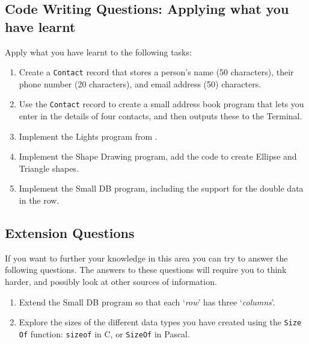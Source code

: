 
\clearpage
\subsection{Code Writing Questions: Applying what you have learnt} %
\label{sub:code_writing_questions_applying_what_you_have_learnt_types}

Apply what you have learnt to the following tasks:

\begin{enumerate}
  \item Create a \texttt{Contact} record that stores a person's name (50 characters), their phone number (20 characters), and email address (50) characters. 
  \item Use the \texttt{Contact} record to create a small address book program that lets you enter in the details of four contacts, and then outputs these to the Terminal.
  \item Implement the Lights program from .
  \item Implement the Shape Drawing program, add the code to create Ellipse and Triangle shapes.
  \item Implement the Small DB program, including the support for the double data in the row.
\end{enumerate}

\bigskip
\subsection{Extension Questions} %
\label{sub:extension_questions_types}

If you want to further your knowledge in this area you can try to answer the following questions. The answers to these questions will require you to think harder, and possibly look at other sources of information.

\begin{enumerate}
  \item Extend the Small DB program so that each `\emph{row}' has three `\emph{columns}'.
  \item Explore the sizes of the different data types you have created using the \texttt{Size Of} function: \texttt{sizeof} in C, or \texttt{SizeOf} in Pascal.
\end{enumerate}
